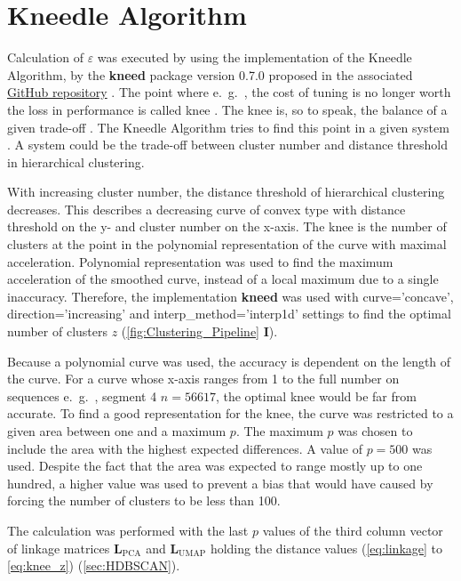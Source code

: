 \section{Kneedle Algorithm} \label{sec:Kneedle}

Calculation of $\varepsilon$ was executed by using the implementation of the Kneedle Algorithm, by the \textbf{kneed} package version 0.7.0 proposed in the associated \href{https://github.com/arvkevi/kneed.git}{GitHub repository} \autocite{satopaa_finding_2011}. The point where e.~g.~, the cost of tuning is no longer worth the loss in performance is called \glqq knee\grqq{} \autocite{satopaa_finding_2011}. The \glqq knee\grqq{} is, so to speak, the balance of a given trade-off \autocite{satopaa_finding_2011}. The Kneedle Algorithm tries to find this point in a given system \autocite{satopaa_finding_2011}. A system could be the trade-off between cluster number and distance threshold in hierarchical clustering. %

With increasing cluster number, the distance threshold of hierarchical clustering decreases. This describes a decreasing curve of convex type with distance threshold on the y- and cluster number on the x-axis. The knee is the number of clusters at the point in the polynomial representation of the curve with maximal acceleration. Polynomial representation was used to find the maximum acceleration of the smoothed curve, instead of a local maximum due to a single inaccuracy. Therefore, the implementation \textbf{kneed} was used with \colorbox{backcolour}{curve='concave'}, \colorbox{backcolour}{direction='increasing'} and \colorbox{backcolour}{interp\_method='interp1d'} settings to find the optimal number of clusters $z$ (\autoref{fig:Clustering_Pipeline} \textsf{\textbf{I}}).

Because a polynomial curve was used, the accuracy is dependent on the length of the curve. For a curve whose x-axis ranges from 1 to the full number on sequences e.~g.~, segment 4 $n=56617$, the optimal knee would be far from accurate. To find a good representation for the knee, the curve was restricted to a given area between one and a maximum $p$. The maximum $p$ was chosen to include the area with the highest expected differences. A value of $p=500$ was used. Despite the fact that the area was expected to range mostly up to one hundred, a higher value was used to prevent a bias that would have caused by forcing the number of clusters to be less than 100.

The calculation was performed with the last $p$ values of the third column vector of linkage matrices $\mathbf{L}_{\text{PCA}}$ and $\mathbf{L}_{\text{UMAP}}$ holding the distance values (\autoref{eq:linkage} to \autoref{eq:knee_z}) (\autoref{sec:HDBSCAN}).


